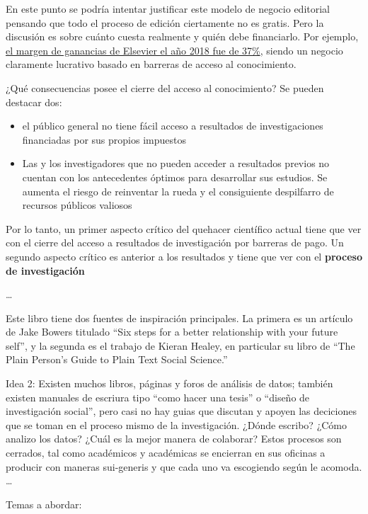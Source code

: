 \documentclass[
  11pt,
]{book}
\begin{document}
En este punto se podría intentar justificar este modelo de negocio editorial pensando que todo el proceso de edición ciertamente no es gratis. Pero la discusión es sobre cuánto cuesta realmente y quién debe financiarlo. Por ejemplo, \href{https://www.thebookseller.com/news/elsevier-records-2-lifts-revenue-and-profits-960016}{el margen de ganancias de Elsevier el año 2018 fue de 37\%}, siendo un negocio claramente lucrativo basado en barreras de acceso al conocimiento.

¿Qué consecuencias posee el cierre del acceso al conocimiento? Se pueden destacar dos:

\begin{itemize}
\item
  el público general no tiene fácil acceso a resultados de investigaciones financiadas por sus propios impuestos
\item
  Las y los investigadores que no pueden acceder a resultados previos no cuentan con los antecedentes óptimos para desarrollar sus estudios. Se aumenta el riesgo de reinventar la rueda y el consiguiente despilfarro de recursos públicos valiosos
\end{itemize}

Por lo tanto, un primer aspecto crítico del quehacer científico actual tiene que ver con el cierre del acceso a resultados de investigación por barreras de pago. Un segundo aspecto crítico es anterior a los resultados y tiene que ver con el \textbf{proceso de investigación}

\ldots{}

Este libro tiene dos fuentes de inspiración principales. La primera es un artículo de Jake Bowers titulado ``Six steps for a better relationship with your future self'', y la segunda es el trabajo de Kieran Healey, en particular su libro de ``The Plain Person's Guide to Plain Text Social Science.'' \citep{Healy2018PlainPersonGuide}

Idea 2: Existen muchos libros, páginas y foros de análisis de datos; también existen manuales de escriura tipo ``como hacer una tesis'' o ``diseño de investigación social'', pero casi no hay guias que discutan y apoyen las deciciones que se toman en el proceso mismo de la investigación. ¿Dónde escribo? ¿Cómo analizo los datos? ¿Cuál es la mejor manera de colaborar? Estos procesos son cerrados, tal como académicos y académicas se encierran en sus oficinas a producir con maneras sui-generis y que cada uno va escogiendo según le acomoda. \ldots{}

Temas a abordar:
\end{document}
